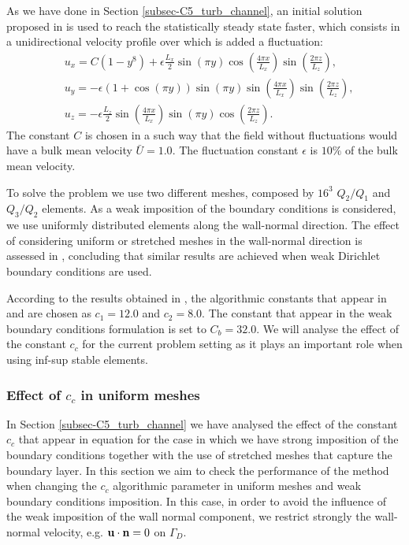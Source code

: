 As we have done in Section \ref{subsec-C5_turb_channel}, an initial solution proposed in \cite{moin_numerical_1980} is used to reach the statistically steady state faster, which consists in a unidirectional velocity profile over which is added a fluctuation:
\begin{align}
\label{eq-C7_TCF_initial_sol}
&u_x = C\left(1-y^8\right)+\epsilon\frac{L_x}{2}\sin(\pi y)\cos\left(\frac{4\pi x}{L_x}\right)\sin\left(\frac{2\pi z}{L_z}\right),\\\nonumber
&u_y = -\epsilon(1+\cos(\pi y))\sin(\pi y)\sin\left(\frac{4\pi x}{L_x}\right)\sin\left(\frac{2\pi z}{L_z}\right),\\
&u_z = -\epsilon\frac{L_z}{2}\sin\left(\frac{4\pi x}{L_x}\right)\sin(\pi y)\cos\left(\frac{2\pi z}{L_z}\right).\nonumber
\end{align}
The constant $C$ is chosen in a such way that the field without fluctuations would have a bulk mean velocity $\bar{U}=1.0$. The fluctuation constant $\epsilon$ is $10\%$ of the bulk mean velocity.

To solve the problem we use two different meshes, composed by $ 16^3 $ $ Q_2/Q_1 $ and $ Q_3/Q_2 $ elements. As a weak imposition of the boundary conditions is considered, we use uniformly distributed elements along the wall-normal direction. The effect of considering uniform or stretched meshes in the wall-normal direction is assessed in \cite{bazilevs_weak_2007}, concluding that similar results are achieved when weak Dirichlet boundary conditions are used.

According to the results obtained in , the algorithmic constants that appear in  and  are chosen as $ c_1=12.0 $ and $ c_2=8.0 $. The constant that appear in the weak boundary conditions formulation is set to $ C_b=32.0 $. We will analyse the effect of the constant $ c_c $ for the current problem setting as it plays an important role when using inf-sup stable elements.
%
\subsubsection{Effect of $ c_c $ in uniform meshes}
In Section \ref{subsec-C5_turb_channel} we have analysed the effect of the constant $ c_c $ that appear in equation  for the case in which we have strong imposition of the boundary conditions together with the use of stretched meshes that capture the boundary layer. In this section we aim to check the performance of the method when changing the $ c_c $ algorithmic parameter in uniform meshes and weak boundary conditions imposition. In this case, in order to avoid the influence of the weak imposition of the wall normal component, we restrict strongly the wall-normal velocity, e.g. $ {\bf u}\cdot{\bf n}=0 $ on $ \Gamma_D $.

